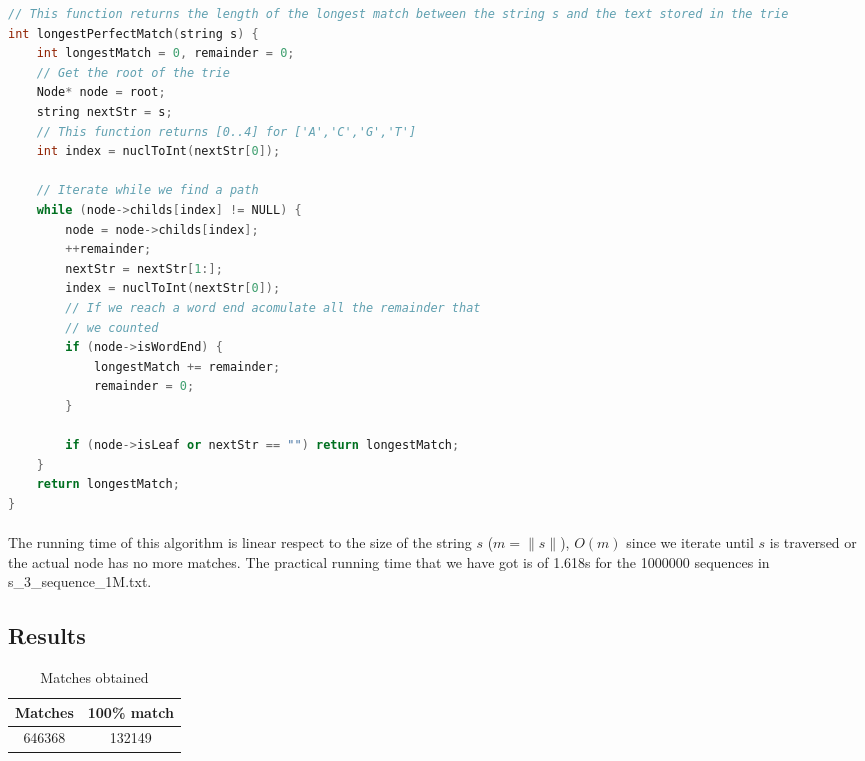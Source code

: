 \documentclass[a4paper,10pt]{article}
\begin{document}
\begin{lstlisting}[language=c++, caption=Iterative algorithm for perfect suffix-prefix match]
// This function returns the length of the longest match between the string s and the text stored in the trie 
int longestPerfectMatch(string s) {
    int longestMatch = 0, remainder = 0;
    // Get the root of the trie
    Node* node = root;
    string nextStr = s;
    // This function returns [0..4] for ['A','C','G','T']
    int index = nuclToInt(nextStr[0]);

    // Iterate while we find a path
    while (node->childs[index] != NULL) {
        node = node->childs[index];
        ++remainder;
        nextStr = nextStr[1:];
        index = nuclToInt(nextStr[0]);
        // If we reach a word end acomulate all the remainder that 
        // we counted
        if (node->isWordEnd) {
            longestMatch += remainder;
            remainder = 0;
        }

        if (node->isLeaf or nextStr == "") return longestMatch;
    }
    return longestMatch;
}
\end{lstlisting}

\paragraph{} The running time of this algorithm is linear respect to the size of the string $s$ ($m = \|s\|$), $O(m)$ since we iterate until $s$ is traversed or the actual node has no more matches. The practical running time that we have got is of 1.618s for the 1000000 sequences in s\_3\_sequence\_1M.txt.

\subsection{Results}

\begin{table}[H]
    \centering
    \begin{tabular}{| c | c |}
        \hline
        Matches & 100\% match \\
        \hline
        \hline
        646368 & 132149 \\
        \hline
    \end{tabular}
    \caption{Matches obtained}
\end{table}
\end{document}
